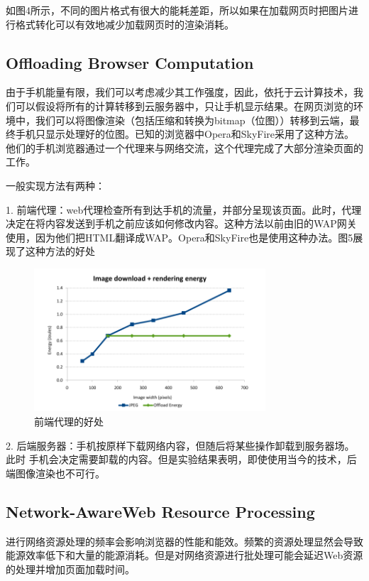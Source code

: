 \documentclass{sig-alternate-05-2015}
\begin{document}
如图4\cite{13}所示，不同的图片格式有很大的能耗差距，所以如果在加载网页时把图片进行格式转化可以有效地减少加载网页时的渲染消耗。

\subsection{Offloading Browser Computation}

由于手机能量有限，我们可以考虑减少其工作强度，因此，依托于云计算技术，我们可以假设将所有的计算转移到云服务器中，只让手机显示结果。在网页浏览的环境中，我们可以将图像渲染（包括压缩和转换为bitmap（位图））转移到云端，最终手机只显示处理好的位图。已知的浏览器中Opera和SkyFire采用了这种方法。他们的手机浏览器通过一个代理来与网络交流，这个代理完成了大部分渲染页面的工作。

一般实现方法有两种：

1.	前端代理：web代理检查所有到达手机的流量，并部分呈现该页面。此时，代理决定在将内容发送到手机之前应该如何修改内容。这种方法以前由旧的WAP网关使用，因为他们把HTML翻译成WAP。Opera和SkyFire也是使用这种办法。图5\cite{13}展现了这种方法的好处

\begin{figure}[htbp]
	\centering
	\includegraphics[width=3.4in]{./figure5}
	\caption{前端代理的好处}\label{fig:tasks}
\end{figure}

2.	后端服务器：手机按原样下载网络内容，但随后将某些操作卸载到服务器场。 此时
手机会决定需要卸载的内容。但是实验结果表明，即使使用当今的技术，后端图像渲染也不可行。

\subsection{Network-AwareWeb Resource Processing}

进行网络资源处理的频率会影响浏览器的性能和能效。频繁的资源处理显然会导致能源效率低下和大量的能源消耗。但是对网络资源进行批处理可能会延迟Web资源的处理并增加页面加载时间。
\end{document}
